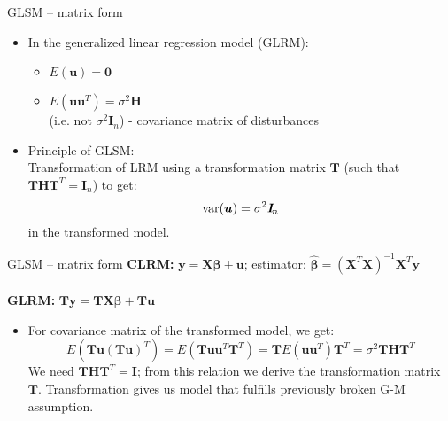 \documentclass{beamer}
\begin{document}
\begin{frame}{GLSM – matrix form}
\begin{itemize}
\item In the generalized linear regression model (GLRM):
\begin{itemize}
\item $E(\boldsymbol{u})=\boldsymbol{0}$
\item $E(\boldsymbol{uu}^T)=\sigma^2\boldsymbol{H}$ \\ (i.e. not $\sigma^2 \boldsymbol{I}_{\! n}$) - covariance matrix of disturbances
\end{itemize}
\vspace{0.5cm}
\item Principle of GLSM: \\Transformation of LRM using a transformation matrix $\boldsymbol{T}$ (such that $\bm{THT}^{T}=\bm{I}_n$) to get: 
$$\textnormal{var}(\boldsymbol{u}) = \sigma^2 \boldsymbol{I}_{\! n}$$
in the transformed model.
\end{itemize}
\end{frame}


\begin{frame}{GLSM – matrix form}
\textbf{CLRM:} \hspace{0.2cm} $\boldsymbol{y}=\boldsymbol{X}\boldsymbol{\beta}+\boldsymbol{u}$; estimator: $\boldsymbol{\hat{\beta}}=(\boldsymbol{X}^T\boldsymbol{X})^{-1}\boldsymbol{X}^T\boldsymbol{y}$ \\
~\\
\textbf{GLRM:} $\boldsymbol{T}\boldsymbol{y}=\boldsymbol{TX}\boldsymbol{\beta}+\boldsymbol{T}\boldsymbol{u}$\\
\begin{itemize}
\item For covariance matrix of the transformed model, we get:
$$E(\boldsymbol{T}\boldsymbol{u}(\boldsymbol{T}\boldsymbol{u})^T)=
E(\boldsymbol{T}\boldsymbol{u}\boldsymbol{u}^T\boldsymbol{T}^T)=\boldsymbol{T} E(\boldsymbol{u}\boldsymbol{u}^T)\boldsymbol{T}^T=\sigma^2\boldsymbol{THT}^T$$
We need $\boldsymbol{THT}^T \! = \boldsymbol{I}$; from this relation we derive the transformation matrix $\boldsymbol{T}$.
Transformation gives us model that fulfills previously broken G-M assumption.
\end{itemize}
\end{frame}

\end{document}
